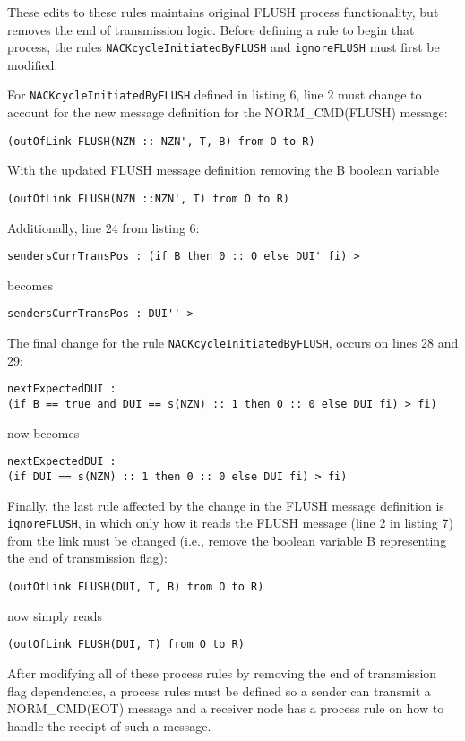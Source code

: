 \documentclass[10pt, journal]{IEEEtran}
\begin{document}
These edits to these rules maintains original FLUSH process functionality, but removes the end of transmission logic. Before defining a rule to begin that process, the rules \texttt{NACKcycleInitiatedByFLUSH} and \texttt{ignoreFLUSH} must first be modified.

For \texttt{NACKcycleInitiatedByFLUSH} defined in listing 6, line 2 must change to account for the new message definition for the NORM\_CMD(FLUSH) message:
\begin{lstlisting}
(outOfLink FLUSH(NZN :: NZN', T, B) from O to R)
\end{lstlisting}
\noindent
With the updated FLUSH message definition removing the B boolean variable
\begin{lstlisting}
(outOfLink FLUSH(NZN ::NZN', T) from O to R)
\end{lstlisting}

\bigbreak
Additionally, line 24 from listing 6:
\begin{lstlisting}
sendersCurrTransPos : (if B then 0 :: 0 else DUI' fi) >
\end{lstlisting}
\noindent
becomes
\begin{lstlisting}
sendersCurrTransPos : DUI'' >
\end{lstlisting}

The final change for the rule \texttt{NACKcycleInitiatedByFLUSH}, occurs on lines 28 and 29:
\begin{lstlisting}
nextExpectedDUI : 
(if B == true and DUI == s(NZN) :: 1 then 0 :: 0 else DUI fi) > fi)  
\end{lstlisting}
now becomes
\begin{lstlisting}
nextExpectedDUI : 
(if DUI == s(NZN) :: 1 then 0 :: 0 else DUI fi) > fi)  
\end{lstlisting}

Finally, the last rule affected by the change in the FLUSH message definition is \texttt{ignoreFLUSH}, in which only how it reads the FLUSH message (line 2 in listing 7) from the link must be changed (i.e., remove the boolean variable B representing the end of transmission flag):
\begin{lstlisting}
(outOfLink FLUSH(DUI, T, B) from O to R)
\end{lstlisting}
\noindent
now simply reads
\begin{lstlisting}
(outOfLink FLUSH(DUI, T) from O to R)
\end{lstlisting}

After modifying all of these process rules by removing the end of transmission flag dependencies, a process rules must be defined so a sender can transmit a NORM\_CMD(EOT) message and a receiver node has a process rule on how to handle the receipt of such a message.
\end{document}
